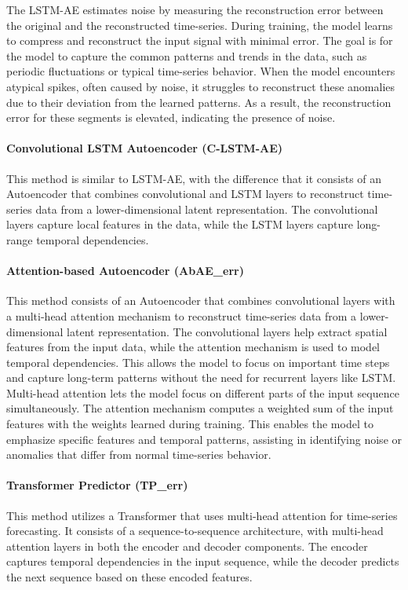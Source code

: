 \documentclass[conference]{IEEEtran}
\begin{document}
The LSTM-AE estimates noise by measuring the reconstruction error between the original and the reconstructed time-series. During training, the model learns to compress and reconstruct the input signal with minimal error. The goal is for the model to capture the common patterns and trends in the data, such as periodic fluctuations or typical time-series behavior. When the model encounters atypical spikes, often caused by noise, it struggles to reconstruct these anomalies due to their deviation from the learned patterns. As a result, the reconstruction error for these segments is elevated, indicating the presence of noise.

\paragraph{Convolutional LSTM Autoencoder (C-LSTM-AE)} This method is similar to LSTM-AE, with the difference that it consists of an Autoencoder that combines convolutional and LSTM layers to reconstruct time-series data from a lower-dimensional latent representation. The convolutional layers capture local features in the data, while the LSTM layers capture long-range temporal dependencies. 
\paragraph{Attention-based Autoencoder (AbAE\_err)} This method consists of an Autoencoder that combines convolutional layers with a multi-head attention mechanism to reconstruct time-series data from a lower-dimensional latent representation. The convolutional layers help extract spatial features from the input data, while the attention mechanism is used to model temporal dependencies. This allows the model to focus on important time steps and capture long-term patterns without the need for recurrent layers like LSTM. Multi-head attention lets the model focus on different parts of the input sequence simultaneously. The attention mechanism computes a weighted sum of the input features with the weights learned during training. This enables the model to emphasize specific features and temporal patterns, assisting in identifying noise or anomalies that differ from normal time-series behavior.
\paragraph{Transformer Predictor (TP\_err)} This method utilizes a Transformer that uses multi-head attention for time-series forecasting. It consists of a sequence-to-sequence architecture, with multi-head attention layers in both the encoder and decoder components. The encoder captures temporal dependencies in the input sequence, while the decoder predicts the next sequence based on these encoded features. 
\end{document}
